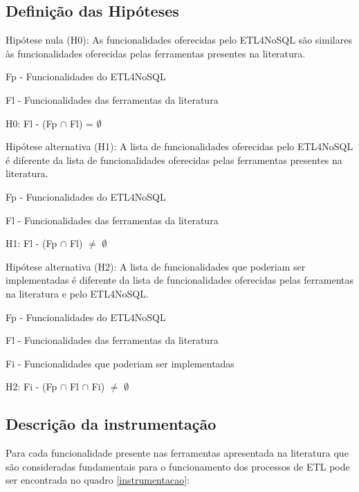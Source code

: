 \subsection{Definição das Hipóteses}

Hipótese nula (H0): As funcionalidades oferecidas pelo ETL4NoSQL são similares às funcionalidades oferecidas pelas ferramentas presentes na literatura.

Fp - Funcionalidades do ETL4NoSQL

Fl - Funcionalidades das ferramentas da literatura

H0: Fl - (Fp $\cap$ Fl) = $\emptyset$
\newline

Hipótese alternativa (H1): A lista de funcionalidades oferecidas pelo ETL4NoSQL é diferente da lista de funcionalidades oferecidas pelas ferramentas presentes na literatura.

Fp - Funcionalidades do ETL4NoSQL

Fl - Funcionalidades das ferramentas da literatura

H1: Fl - (Fp $\cap$ Fl) $\neq$ $\emptyset$
\newline

Hipótese alternativa (H2): A lista de funcionalidades que poderiam ser implementadas é diferente da lista de funcionalidades oferecidas pelas ferramentas na literatura e pelo ETL4NoSQL.

Fp - Funcionalidades do ETL4NoSQL

Fl - Funcionalidades das ferramentas da literatura

Fi - Funcionalidades que poderiam ser implementadas

H2: Fi - (Fp $\cap$ Fl $\cap$ Fi) $\neq$ $\emptyset$

\subsection{Descrição da instrumentação}

Para cada funcionalidade presente nas ferramentas apresentada na literatura que são consideradas fundamentais para o funcionamento dos processos de ETL pode ser encontrada no quadro \ref{instrumentacao}:

